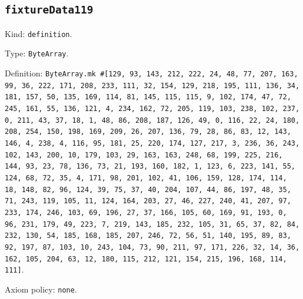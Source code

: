 \documentclass[11pt]{article}
\begin{document}
\subsection*{\texttt{fixtureData119}}
\noindent Kind: \texttt{definition}.\par
\noindent Type: \texttt{ByteArray}.\par
\noindent Definition: \texttt{ByteArray.mk \#[129, 93, 143, 212, 222, 24, 48, 77, 207, 163, 99, 36, 222, 171, 208, 233, 111, 32, 154, 129, 218, 195, 111, 136, 34, 181, 157, 50, 135, 169, 114, 81, 145, 115, 115, 9, 102, 174, 47, 72, 245, 161, 55, 136, 121, 4, 234, 162, 72, 205, 119, 103, 238, 102, 237, 0, 211, 43, 37, 18, 1, 48, 86, 208, 187, 126, 49, 0, 116, 22, 24, 180, 208, 254, 150, 198, 169, 209, 26, 207, 136, 79, 28, 86, 83, 12, 143, 146, 4, 238, 4, 116, 95, 181, 25, 220, 174, 127, 217, 3, 236, 36, 243, 102, 143, 200, 10, 179, 103, 29, 163, 163, 248, 68, 199, 225, 216, 144, 93, 23, 78, 136, 73, 21, 193, 160, 182, 1, 123, 6, 223, 141, 55, 124, 68, 72, 35, 4, 171, 98, 201, 102, 41, 106, 159, 128, 174, 114, 18, 148, 82, 96, 124, 39, 75, 37, 40, 204, 107, 44, 86, 197, 48, 35, 71, 243, 119, 105, 11, 124, 164, 203, 27, 46, 227, 240, 41, 207, 97, 233, 174, 246, 103, 69, 196, 27, 37, 166, 105, 60, 169, 91, 193, 0, 96, 231, 179, 49, 223, 7, 219, 143, 185, 232, 105, 31, 65, 37, 82, 84, 232, 130, 54, 185, 168, 185, 207, 246, 72, 56, 51, 140, 195, 89, 83, 92, 197, 87, 103, 10, 243, 104, 73, 90, 211, 97, 171, 226, 32, 14, 36, 162, 105, 204, 63, 12, 180, 115, 212, 121, 154, 215, 196, 168, 114, 111]}.\par
\noindent Axiom policy: \texttt{none}.\par
\end{document}
